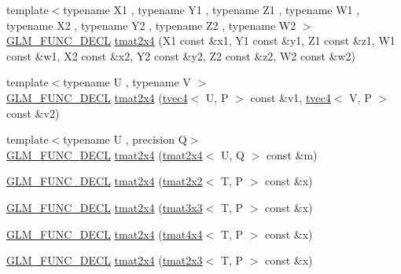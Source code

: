 \begin{DoxyCompactItemize}
\item 
{\footnotesize template$<$typename X1 , typename Y1 , typename Z1 , typename W1 , typename X2 , typename Y2 , typename Z2 , typename W2 $>$ }\\\hyperlink{setup_8hpp_ab2d052de21a70539923e9bcbf6e83a51}{G\+L\+M\+\_\+\+F\+U\+N\+C\+\_\+\+D\+E\+CL} \hyperlink{structglm_1_1detail_1_1tmat2x4_a062180e9aa13dc809833a430d28ac3df}{tmat2x4} (X1 const \&x1, Y1 const \&y1, Z1 const \&z1, W1 const \&w1, X2 const \&x2, Y2 const \&y2, Z2 const \&z2, W2 const \&w2)
\item 
{\footnotesize template$<$typename U , typename V $>$ }\\\hyperlink{setup_8hpp_ab2d052de21a70539923e9bcbf6e83a51}{G\+L\+M\+\_\+\+F\+U\+N\+C\+\_\+\+D\+E\+CL} \hyperlink{structglm_1_1detail_1_1tmat2x4_a83ae4e28845c271611c3c4a41d9afb83}{tmat2x4} (\hyperlink{structglm_1_1detail_1_1tvec4}{tvec4}$<$ U, P $>$ const \&v1, \hyperlink{structglm_1_1detail_1_1tvec4}{tvec4}$<$ V, P $>$ const \&v2)
\item 
{\footnotesize template$<$typename U , precision Q$>$ }\\\hyperlink{setup_8hpp_ab2d052de21a70539923e9bcbf6e83a51}{G\+L\+M\+\_\+\+F\+U\+N\+C\+\_\+\+D\+E\+CL} \hyperlink{structglm_1_1detail_1_1tmat2x4_a112e455f02edb2c42ef8c0ad72495a4e}{tmat2x4} (\hyperlink{structglm_1_1detail_1_1tmat2x4}{tmat2x4}$<$ U, Q $>$ const \&m)
\item 
\hyperlink{setup_8hpp_ab2d052de21a70539923e9bcbf6e83a51}{G\+L\+M\+\_\+\+F\+U\+N\+C\+\_\+\+D\+E\+CL} \hyperlink{structglm_1_1detail_1_1tmat2x4_aef916b6a3c4b7957458c9b7bc5895841}{tmat2x4} (\hyperlink{structglm_1_1detail_1_1tmat2x2}{tmat2x2}$<$ T, P $>$ const \&x)
\item 
\hyperlink{setup_8hpp_ab2d052de21a70539923e9bcbf6e83a51}{G\+L\+M\+\_\+\+F\+U\+N\+C\+\_\+\+D\+E\+CL} \hyperlink{structglm_1_1detail_1_1tmat2x4_a5b2e53893c5960805f0315217f4fc5e9}{tmat2x4} (\hyperlink{structglm_1_1detail_1_1tmat3x3}{tmat3x3}$<$ T, P $>$ const \&x)
\item 
\hyperlink{setup_8hpp_ab2d052de21a70539923e9bcbf6e83a51}{G\+L\+M\+\_\+\+F\+U\+N\+C\+\_\+\+D\+E\+CL} \hyperlink{structglm_1_1detail_1_1tmat2x4_aab92f80bbe5811c595f4c55ed1c7d186}{tmat2x4} (\hyperlink{structglm_1_1detail_1_1tmat4x4}{tmat4x4}$<$ T, P $>$ const \&x)
\item 
\hyperlink{setup_8hpp_ab2d052de21a70539923e9bcbf6e83a51}{G\+L\+M\+\_\+\+F\+U\+N\+C\+\_\+\+D\+E\+CL} \hyperlink{structglm_1_1detail_1_1tmat2x4_a03a38c13272b397389f748a852b70bbd}{tmat2x4} (\hyperlink{structglm_1_1detail_1_1tmat2x3}{tmat2x3}$<$ T, P $>$ const \&x)

\end{DoxyCompactItemize}

